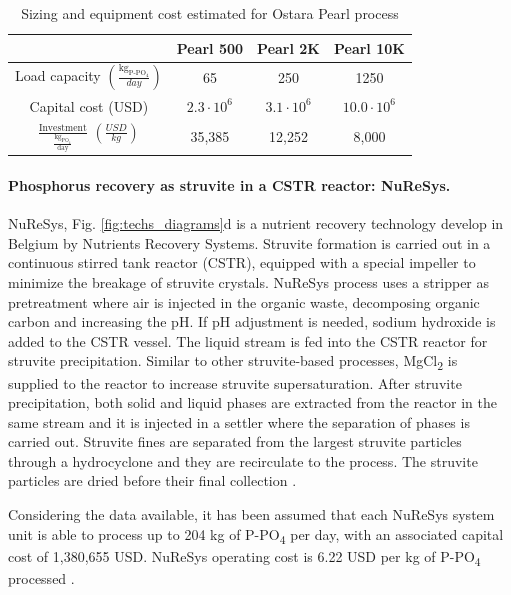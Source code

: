 \documentclass[10pt,a4paper]{article}
\begin{document}
\begin{table}[H] 
	\begin{adjustwidth}{}{}
		\centering
		\caption{Sizing and equipment cost estimated for Ostara Pearl process} \label{table:ostara_costs}
		\begin{tabular}{c c c c}
			\toprule
			& Pearl 500 & Pearl 2K	& Pearl 10K	\\ \midrule
			Load capacity $\left(\frac{\text{kg}_{\text{P-PO}_\text{4}}}{day}\right)$ & 65 & 250 & 1250 	\\
			Capital cost (USD)	& $2.3 \cdot 10^{6}$ & $3.1 \cdot 10^{6}$  & $10.0 \cdot 10^{6}$  	\\
			$\frac{\text{Investment}}{  \frac{\text{kg}_{\text{PO}_\text{4}}}{\text{day}}}$  $\left(\frac{USD}{kg}\right)$	& 35,385 & 12,252 & 8,000  \\ 
			\bottomrule 
		\end{tabular}
	\end{adjustwidth}
\end{table}

\paragraph{Phosphorus recovery as struvite in a CSTR reactor: NuReSys.}
NuReSys, Fig. \ref{fig:techs_diagrams}d is a nutrient recovery technology develop in Belgium by Nutrients Recovery Systems. Struvite formation is carried out in a continuous stirred tank reactor (CSTR), equipped with a special impeller to minimize the breakage of struvite crystals. NuReSys process uses a stripper as pretreatment where air is injected in the organic waste, decomposing organic carbon and increasing the pH. If pH adjustment is needed, sodium hydroxide is added to the CSTR vessel. The liquid stream is fed into the CSTR reactor for struvite precipitation. Similar to other struvite-based processes, MgCl\textsubscript{2} is supplied to the reactor to increase struvite supersaturation. After struvite precipitation, both solid and liquid phases are extracted from the reactor in the same stream and it is injected in a settler where the separation of phases is carried out. Struvite fines are separated from the largest struvite particles through a hydrocyclone and they are recirculate to the process. The struvite particles are dried before their final collection .

Considering the data available, it has been assumed that each NuReSys system unit is able to process up to 204 kg of P-PO\textsubscript{4} per day, with an associated capital cost of 1,380,655 USD. NuReSys operating cost is 6.22 USD per kg of P-PO\textsubscript{4} processed .
\end{document}
